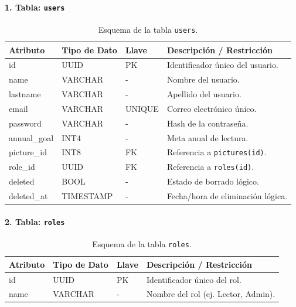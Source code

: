 \documentclass[12pt, atypical, journal]{article}
\begin{document}
\paragraph{1. Tabla: \texttt{users}}
\begin{table}[H]
	\centering
	\begin{tabular}{|l|l|l|p{6.5cm}|}
		\hline
		\textbf{Atributo} & \textbf{Tipo de Dato} & \textbf{Llave} & \textbf{Descripción / Restricción} \\ \hline
		id & UUID & PK & Identificador único del usuario. \\ \hline
		name & VARCHAR & - & Nombre del usuario. \\ \hline
		lastname & VARCHAR & - & Apellido del usuario. \\ \hline
		email & VARCHAR & UNIQUE & Correo electrónico único. \\ \hline
		password & VARCHAR & - & Hash de la contraseña. \\ \hline
		annual\_goal & INT4 & - & Meta anual de lectura. \\ \hline
		picture\_id & INT8 & FK & Referencia a \texttt{pictures(id)}. \\ \hline
		role\_id & UUID & FK & Referencia a \texttt{roles(id)}. \\ \hline
		deleted & BOOL & - & Estado de borrado lógico. \\ \hline
		deleted\_at & TIMESTAMP & - & Fecha/hora de eliminación lógica. \\ \hline
	\end{tabular}
	\caption{Esquema de la tabla \texttt{users}.}
\end{table}

\paragraph{2. Tabla: \texttt{roles}}
\begin{table}[H]
	\centering
	\begin{tabular}{|l|l|l|p{6.5cm}|}
		\hline
		\textbf{Atributo} & \textbf{Tipo de Dato} & \textbf{Llave} & \textbf{Descripción / Restricción} \\ \hline
		id & UUID & PK & Identificador único del rol. \\ \hline
		name & VARCHAR & - & Nombre del rol (ej. Lector, Admin). \\ \hline
	\end{tabular}
	\caption{Esquema de la tabla \texttt{roles}.}
\end{table}
\end{document}
